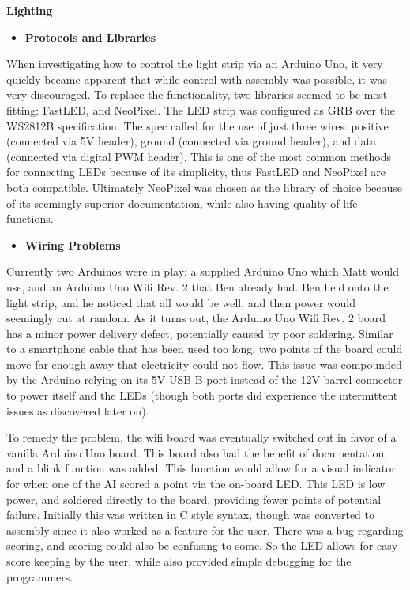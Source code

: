 \documentclass[twoside]{article}
\begin{document}
\hfill \break
\noindent\textbf{\Large Lighting}
\begin{itemize}
    \item\textbf{Protocols and Libraries}
\end{itemize}
\text When investigating how to control the light strip via an Arduino Uno, it very quickly became apparent that while control with assembly was possible, it was very discouraged. To replace the functionality, two libraries seemed to be most fitting: FastLED, and NeoPixel. The LED strip was configured as GRB over the WS2812B specification. The spec called for the use of just three wires: positive (connected via 5V header), ground (connected via ground header), and data (connected via digital PWM header). This is one of the most common methods for connecting LEDs because of its simplicity, thus FastLED and NeoPixel are both compatible. Ultimately NeoPixel was chosen as the library of choice because of its seemingly superior documentation, while also having quality of life functions. 

\begin{itemize}
    \item\textbf{Wiring Problems}
\end{itemize}
\text Currently two Arduinos were in play: a supplied Arduino Uno which Matt would use, and an Arduino Uno Wifi Rev. 2 that Ben already had. Ben held onto the light strip, and he noticed that all would be well, and then power would seemingly cut at random. As it turns out, the Arduino Uno Wifi Rev. 2 board has a minor power delivery defect, potentially caused by poor soldering. Similar to a smartphone cable that has been used too long, two points of the board could move far enough away that electricity could not flow. This issue was compounded by the Arduino relying on its 5V USB-B port instead of the 12V barrel connector to power itself and the LEDs (though both ports did experience the intermittent issues as discovered later on).

To remedy the problem, the wifi board was eventually switched out in favor of a vanilla Arduino Uno board. This board also had the benefit of documentation, and a blink function was added. This function would allow for a visual indicator for when one of the AI scored a point via the on-board LED. This LED is low power, and soldered directly to the board, providing fewer points of potential failure. Initially this was written in C style syntax, though was converted to assembly since it also worked as a feature for the user. There was a bug regarding scoring, and scoring could also be confusing to some. So the LED allows for easy score keeping by the user, while also provided simple debugging for the programmers.
\end{document}
